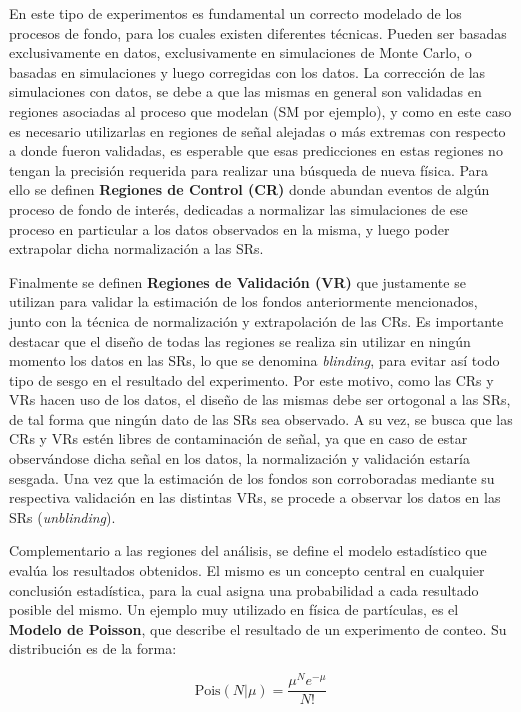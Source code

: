 En este tipo de experimentos es fundamental un correcto modelado de los procesos de fondo,  para los cuales existen diferentes técnicas. Pueden ser basadas exclusivamente en datos, exclusivamente en simulaciones de Monte Carlo, o basadas en simulaciones y  luego corregidas con los datos. La corrección de las simulaciones con datos, se debe a que las mismas en general son validadas en regiones asociadas al proceso que modelan (SM por ejemplo), y como en este caso es necesario utilizarlas en regiones de señal alejadas o más extremas con respecto a donde fueron validadas, es esperable que esas predicciones en estas regiones no tengan la precisión requerida para realizar una búsqueda de nueva física. Para ello se definen \textbf{Regiones de Control (CR)} donde abundan eventos de algún proceso de fondo de interés, dedicadas a normalizar las simulaciones de ese proceso en particular a los datos observados en la misma, y luego poder extrapolar dicha normalización a las SRs.

Finalmente se definen \textbf{Regiones de Validación (VR)} que justamente se utilizan para validar la estimación de los fondos anteriormente mencionados, junto con la técnica de normalización y extrapolación de las CRs. Es importante destacar que el diseño de todas las regiones se realiza sin utilizar en ningún momento los datos en las SRs, lo que se denomina \textit{blinding}, para evitar así todo tipo de sesgo en el resultado del experimento. Por este motivo, como las CRs y VRs hacen uso de los datos, el diseño de las mismas debe ser ortogonal a las SRs, de tal forma que ningún dato de las SRs sea observado. A su vez, se busca que las CRs y VRs estén libres de contaminación de señal, ya que en caso de estar observándose dicha señal en los datos, la normalización y validación estaría sesgada.
Una vez que la estimación de los fondos son corroboradas mediante su respectiva validación en las distintas VRs, se procede a observar los datos en las SRs (\textit{unblinding}).

Complementario a las regiones del análisis, se define el modelo estadístico que evalúa los resultados obtenidos. El mismo es un concepto central en cualquier conclusión estadística, para la cual asigna una probabilidad a cada resultado posible del mismo. Un ejemplo muy utilizado en física de partículas, es el \textbf{Modelo de Poisson}, que describe el resultado de un experimento de conteo. Su distribución es de la forma:

\begin{equation}
	\text{Pois}(N|\mu) = \frac{\mu^{N}e^{-\mu}}{N!}
\end{equation}

